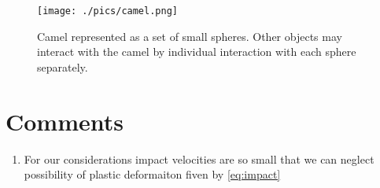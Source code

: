\documentclass[10pt,a4paper]{article}
\begin{document}
\begin{figure}[tb]
\centering
\texttt{[image: ./pics/camel.png]}
\caption{Camel represented as a set of small spheres. Other objects may interact with the camel by individual interaction with each sphere separately.}
\label{fig:camel}
\end{figure}

\section{Comments}
\begin{enumerate}
 \item For our considerations impact velocities are so small that we can neglect possibility of plastic deformaiton fiven by \ref{eq:impact}
\end{enumerate}




\thispagestyle{empty} %




\clearpage
\end{document}
